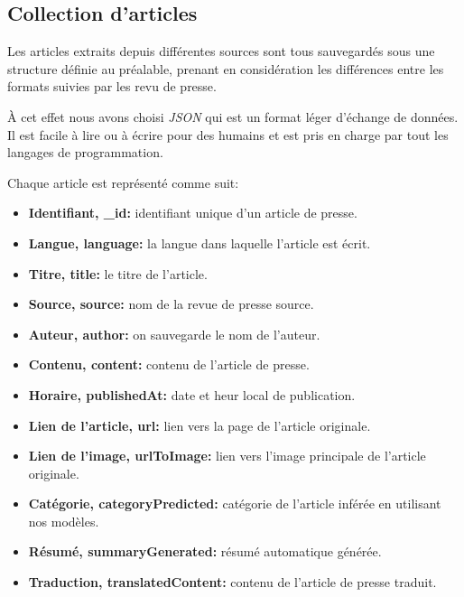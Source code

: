 \subsection{Collection d'articles}
Les articles extraits depuis différentes sources sont tous sauvegardés sous une structure définie au préalable, prenant en considération les différences entre les formats suivies par les revu de presse. 

À cet effet nous avons choisi \emph{JSON} qui est un format léger d'échange de données. Il est facile à lire ou à écrire pour des humains\cite{json} et est pris en charge par tout les langages de programmation.

Chaque article est représenté comme suit:
\begin{itemize}
    \item \textbf{Identifiant, \textquotedbl \_id\textquotedbl: } identifiant unique d'un article de presse.
    \item \textbf{Langue, \textquotedbl language\textquotedbl:} la langue dans laquelle l'article est écrit.
    \item \textbf{Titre, \textquotedbl title\textquotedbl:} le titre de l'article.
    \item \textbf{Source, \textquotedbl source\textquotedbl:} nom de la revue de presse source.
    \item \textbf{Auteur, \textquotedbl author\textquotedbl:} on sauvegarde le nom de l'auteur.
    \item \textbf{Contenu, \textquotedbl content\textquotedbl:} contenu de l'article de presse.
    \item \textbf{Horaire, \textquotedbl publishedAt\textquotedbl:} date et heur local de publication.
    \item \textbf{Lien de l'article, \textquotedbl url\textquotedbl:} lien vers la page de l'article originale.
    \item \textbf{Lien de l'image, \textquotedbl urlToImage\textquotedbl:} lien vers l'image principale de l'article originale.
    \item \textbf{Catégorie, \textquotedbl categoryPredicted\textquotedbl:} catégorie de l'article inférée en utilisant nos modèles.
    \item \textbf{Résumé, \textquotedbl summaryGenerated\textquotedbl:} résumé automatique générée.
    \item \textbf{Traduction, \textquotedbl translatedContent\textquotedbl:} contenu de l'article de presse traduit.\\
\end{itemize}

